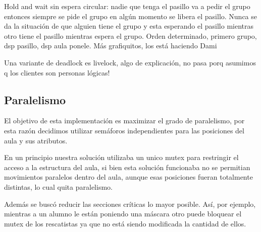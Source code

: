 Hold and wait sin espera circular: nadie que tenga el pasillo va a pedir el grupo entonces siempre se pide el grupo en algún momento se libera el pasillo.
Nunca se da la situación de que alguien tiene el grupo y esta esperando el pasillo mientras otro tiene el pasillo mientras espera el grupo.
Orden determinado, primero grupo, dsp pasillo, dsp aula ponele.
Más grafiquitos, los está haciendo Dami

Una variante de deadlock es livelock, algo de explicación, no pasa porq asumimos q los clientes son personas lógicas!

\subsection{Paralelismo}
El objetivo de esta implementación es maximizar el grado de paralelismo, por esta razón decidimos utilizar semáforos independientes para las posiciones
del aula y sus atributos.

En un principio nuestra solución utilizaba un unico mutex para restringir el acceso a la estructura del aula, si bien esta solución funcionaba
no se permitian movimientos paralelos dentro del aula, aunque esas posiciones fueran totalmente distintas, lo cual quita paralelismo.

Además se buscó reducir las secciones críticas lo mayor posible. Así, por ejemplo, mientras a un alumno le están poniendo una máscara otro puede bloquear el mutex
de los rescatistas ya que no está siendo modificada la cantidad de ellos.

